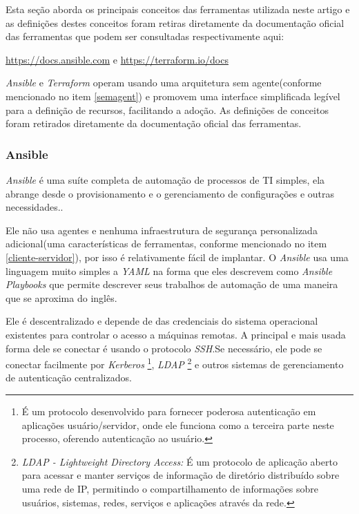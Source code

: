 Esta seção aborda os principais conceitos das ferramentas utilizada neste artigo e as definições destes conceitos foram retiras diretamente da documentação oficial das ferramentas que podem ser consultadas respectivamente aqui: 

\href{https://docs.ansible.com}{https://docs.ansible.com} e \href{https://terraform.io/docs}{https://terraform.io/docs}

\textit{Ansible} e \textit{Terraform} operam usando uma arquitetura sem agente(conforme mencionado no item \ref{semagent}) e promovem uma interface simplificada legível para a definição de recursos, facilitando a adoção. As definições de conceitos foram retirados diretamente da documentação oficial das ferramentas.


\subsubsection{Ansible}

\textit{Ansible} é uma suíte completa de automação de processos de TI simples, ela abrange desde o provisionamento e o gerenciamento de configurações e outras necessidades..

Ele não usa agentes e nenhuma infraestrutura de segurança personalizada adicional(uma características de ferramentas, conforme mencionado no item \ref{cliente-servidor}), por isso é relativamente fácil de implantar. O \textit{Ansible} usa uma linguagem muito simples a \textit{YAML} na forma que eles descrevem como \textit{Ansible Playbooks} que permite descrever seus trabalhos de automação de uma maneira que se aproxima do inglês. 

Ele é descentralizado e depende de das credenciais do sistema operacional existentes para controlar o acesso a máquinas remotas. A principal e mais usada forma dele se conectar é usando o protocolo \textit{SSH}.Se necessário, ele pode se conectar facilmente por \textit{Kerberos} \footnote{É um protocolo desenvolvido para fornecer poderosa autenticação em aplicações usuário/servidor, onde ele funciona como a terceira parte neste processo, oferendo autenticação ao usuário.}, \textit{LDAP} \footnote{\textit{LDAP - Lightweight Directory Access:} É um protocolo de aplicação aberto para acessar e manter serviços de informação de diretório distribuído sobre uma rede de IP, permitindo o compartilhamento de informações sobre usuários, sistemas, redes, serviços e aplicações através da rede.} e outros sistemas de gerenciamento de autenticação centralizados.


